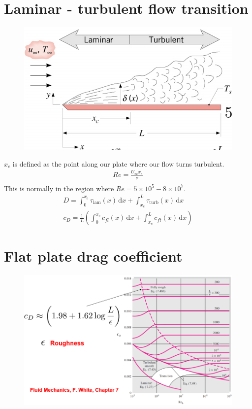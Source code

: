 \documentclass[class=report, crop=false, 12pt,a4paper]{standalone}
\begin{document}
\section{Laminar - turbulent flow transition}
\begin{figure}[H]
  \centering
  \includegraphics[width = 0.8 \textwidth]{../img/diagram76.png}
  \caption{}
\end{figure}
$x_c$ is defined as the point along our plate where our flow turns turbulent.
\begin{gather}
  Re = \frac{U_\infty x_c}{\nu}\\
\end{gather}
This is normally in the region where $Re = 5 \times 10^5 - 8\times 10^7$.
\begin{align}
  D = \int_{0}^{x_c} \tau_{\textrm{lam}} (x) \,\mathrm{d}x + \int_{x_c}^{L} \tau_{\textrm{turb}} (x) \,\mathrm{d}x\\
  c_D = \frac{1}{L} \left( \int_{0}^{x_c} c_{fl} (x) \,\mathrm{d}x + \int_{x_c}^{L} c_{ft} (x) \,\mathrm{d}x  \right)  
\end{align}
\section{Flat plate drag coefficient}
\begin{figure}[H]
  \centering
  \includegraphics[width = 0.8 \textwidth]{../img/diagram77.png}
  \caption{}
\end{figure}
\end{document}
